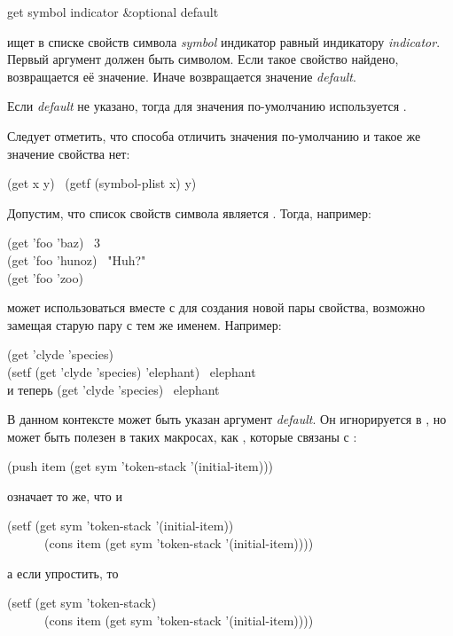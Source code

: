 \begin{defun}[Function]
get symbol indicator &optional default

 ищет в списке свойств символа \emph{symbol} индикатор равный 
индикатору \emph{indicator}.
Первый аргумент должен быть символом.
Если такое свойство найдено, возвращается её значение. Иначе возвращается
значение \emph{default}.

Если \emph{default} не указано, тогда для значения по-умолчанию используется
{\false}.

Следует отметить, что способа отличить значения по-умолчанию и такое же значение
свойства нет:
\begin{lisp}
(get x y) \EQ\ (getf (symbol-plist x) y)
\end{lisp}
Допустим, что список свойств символа  является .
Тогда, например:
\begin{lisp}
(get 'foo 'baz) \EV\ 3 \\
(get 'foo 'hunoz) \EV\ "Huh?" \\
(get 'foo 'zoo) \EV\ {\false}
\end{lisp}

 может использоваться вместе с  для создания новой пары
свойства, возможно замещая старую пару с тем же именем.
Например:
\begin{lisp}
(get 'clyde 'species) \EV\ {\false} \\
(setf (get 'clyde 'species) 'elephant) \EV\ elephant \\
\textrm{и теперь} (get 'clyde 'species) \EV\ elephant
\end{lisp}
В данном контексте может быть указан аргумент \emph{default}. Он игнорируется в
, но может быть полезен в таких макросах, как , которые
связаны с :
\begin{lisp}
(push item (get sym 'token-stack '(initial-item)))
\end{lisp}
означает то же, что и
\begin{lisp}
(setf (get sym 'token-stack '(initial-item)) \\
~~~~~~(cons item (get sym 'token-stack '(initial-item))))
\end{lisp}
а если упростить, то
\begin{lisp}
(setf (get sym 'token-stack) \\
~~~~~~(cons item (get sym 'token-stack '(initial-item))))
\end{lisp}
\end{defun}

